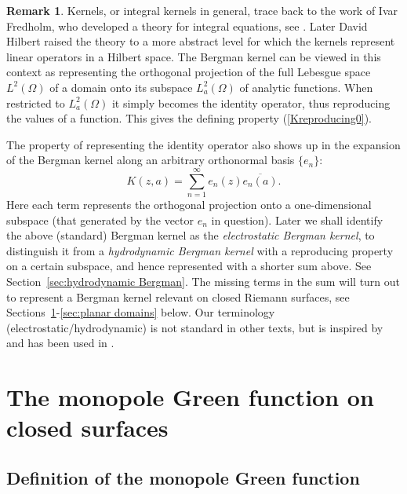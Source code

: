 \documentclass[reqno,12pt]{article}
\theoremstyle{plain}
\theoremstyle{definition}
\newtheorem{remark}[defn]{Remark}
\numberwithin{equation}{section}
\numberwithin{figure}{section}
\begin{document}
\begin{remark}\label{rem:Fredholm}
Kernels, or integral kernels in general, trace back  to the work of Ivar Fredholm, who developed a theory
for integral equations, see \cite{Fredholm-1903, Courant-Hilbert-1943}.
 Later David Hilbert raised the theory to a more abstract level for which the kernels
represent linear operators in a Hilbert space. The Bergman kernel can be viewed in this context as 
representing the orthogonal projection of the full Lebesgue space $L^2(\Omega)$ of a domain
onto its subspace $L^2_a(\Omega)$ of analytic functions. When restricted to
$L^2_a(\Omega)$ it simply becomes the identity operator, thus 
reproducing the values of a function. This gives the defining property (\ref{Kreproducing0}).

The property of representing the identity operator also shows up in the expansion of the Bergman kernel along 
an arbitrary orthonormal basis $\{e_n\}$:
$$
K(z,a)=\sum_{n=1}^\infty e_n(z)\overline{e_n(a)}.
$$ 
Here each term represents the orthogonal projection onto a one-dimensional subspace (that generated by the vector $e_n$
in question). Later we shall identify the above (standard) Bergman kernel as the {\it electrostatic Bergman kernel}, to distinguish
it from a {\it hydrodynamic Bergman kernel} with a reproducing property on a certain subspace, and hence represented 
with a shorter sum above. See Section~\ref{sec:hydrodynamic Bergman}. The missing terms in the sum will turn out to represent
a Bergman kernel relevant on closed Riemann surfaces, see Sections~\ref{sec:monopole Green}-\ref{sec:planar domains} 
below. Our terminology  (electrostatic/hydrodynamic) is not standard in other texts, but is inspired by \cite{Cohn-1980} and has been used in 
\cite{Grotta-Ragazzo-Gustafsson-Koiller-2024}.

\end{remark}


\section{The monopole Green function on closed surfaces}\label{sec:monopole Green}

\subsection{Definition of the monopole Green function}\label{sec:definition Green}
\end{document}
